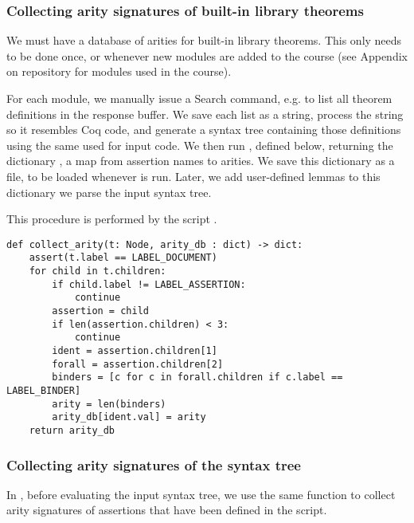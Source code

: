 \subsubsection{Collecting arity signatures of built-in library theorems}
We must have a database of arities for built-in library theorems. This only needs to be done once, or whenever new modules are added to the course (see Appendix on repository for modules used in the course).

For each module, we manually issue a Search command, e.g.  to list all theorem definitions in the response buffer. We save each list as a string, process the string so it resembles Coq code, and generate a syntax tree containing those definitions using the same  used for input code. We then run , defined below, returning the dictionary , a map from assertion names to arities. We save this dictionary as a file, to be loaded whenever  is run. Later, we add user-defined lemmas to this dictionary we parse the input syntax tree.

This procedure is performed by the script .

\begin{verbatim}
def collect_arity(t: Node, arity_db : dict) -> dict:
    assert(t.label == LABEL_DOCUMENT)
    for child in t.children:
        if child.label != LABEL_ASSERTION:
            continue
        assertion = child
        if len(assertion.children) < 3: 
            continue
        ident = assertion.children[1]
        forall = assertion.children[2]
        binders = [c for c in forall.children if c.label == LABEL_BINDER]
        arity = len(binders)
        arity_db[ident.val] = arity
    return arity_db
\end{verbatim}

\subsubsection{Collecting arity signatures of the syntax tree}
In , before evaluating the input syntax tree, we use the same  function to collect arity signatures of assertions that have been defined in the script.

